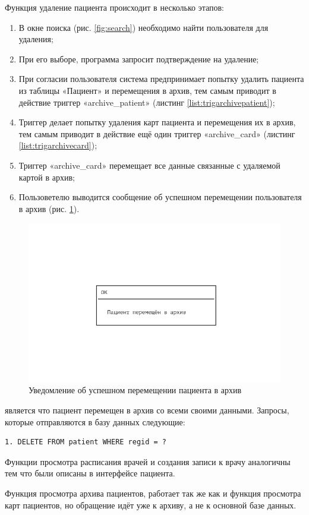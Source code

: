 \documentclass[14pt,a4paper,russian]{extreport}
\begin{document}
Функция удаление пациента происходит в несколько этапов:
\begin{enumerate}
	\item В окне поиска (рис. \ref{fig:search}) необходимо найти пользователя для удаления;
	\item При его выборе, программа запросит подтверждение на удаление;
	\item При согласии пользователя система предпринимает попытку удалить пациента из таблицы «Пациент» и перемещения в архив, тем самым приводит в действие триггер «archive\_patient» (листинг \ref{list:trigarchivepatient});
	\item Триггер делает попытку удаления карт пациента и перемещения их в архив, тем самым приводит в действие ещё один триггер «archive\_card» (листинг \ref{list:trigarchivecard});
	\item Триггер «archive\_card» перемещает все данные связанные с удаляемой картой в архив;
	\item Пользоветелю выводится сообщение об успешном перемещении пользователя в архив (рис. \ref{fig:success-archive}).
\end{enumerate}
\begin{figure}[h!]
        \includegraphics[width=\textwidth]{prog_int/success-archive}
        \caption{Уведомление об успешном перемещении пациента в архив}
        \label{fig:success-archive}
\end{figure}
 является что пациент перемещен в архив со всеми своими данными.
Запросы, которые отправляются в базу данных следующие: 
\begin{lstlisting}[style=csql] 
1. DELETE FROM patient WHERE regid = ?
\end{lstlisting}
\par
Функции просмотра расписания врачей и создания записи к врачу аналогичны тем что были описаны в интерфейсе пациента.\par
Функция просмотра архива пациентов, работает так же как и функция просмотра карт пациентов, но обращение идёт уже к архиву, а не к основной базе данных.\par
\end{document}
